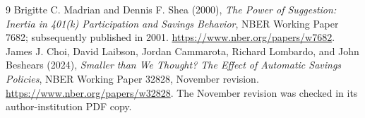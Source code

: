 \documentclass[11pt]{article}
\begin{document}
\begin{thebibliography}{9}
 Brigitte C. Madrian and Dennis F. Shea (2000),
\emph{The Power of Suggestion: Inertia in 401(k) Participation and Savings
Behavior}, NBER Working Paper 7682; subsequently published in 2001.
\url{https://www.nber.org/papers/w7682}.
 James J. Choi, David Laibson, Jordan Cammarota, Richard Lombardo,
and John Beshears (2024), \emph{Smaller than We Thought? The Effect of
Automatic Savings Policies}, NBER Working Paper 32828, November revision.
\url{https://www.nber.org/papers/w32828}.
The November revision was checked in its author-institution PDF copy.
\end{thebibliography}
\end{document}
